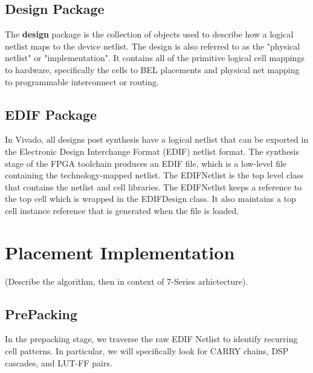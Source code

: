 \documentclass[twocolumn]{article}
\begin{document}
    \subsection{Design Package}
    The \textbf{design} package is the collection of objects used to describe how a logical netlist maps to the device netlist. 
    The design is also referred to as the "physical netlist" or "implementation". 
    It contains all of the primitive logical cell mappings to hardware, specifically the cells to BEL placements and physical net mapping to programmable interconnect or routing. 

    \subsection{EDIF Package}
    In Vivado, all designs post synthesis have a logical netlist that can be exported in the Electronic Design Interchange Format (EDIF) netlist format.
    The synthesis stage of the FPGA toolchain produces an EDIF file, which is a low-level file containing the technology-mapped netlist.
    The EDIFNetlist is the top level class that contains the netlist and cell libraries. 
    The EDIFNetlist keeps a reference to the top cell which is wrapped in the EDIFDesign class. 
    It also maintains a top cell instance reference that is generated when the file is loaded. 


\section{Placement Implementation}
    (Describe the algorithm, then in context of 7-Series arhictecture). \\
    \subsection{PrePacking}
        In the prepacking stage, we traverse the raw EDIF Netlist to identify recurring cell patterns. In particular, we will specifically look for CARRY chains, DSP cascades, and LUT-FF pairs.
\end{document}
